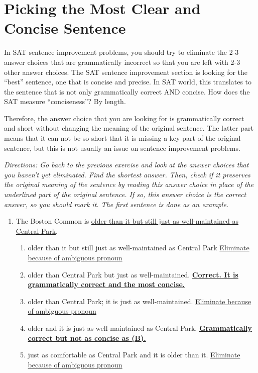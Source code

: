 \section{Picking the Most Clear and Concise Sentence}

In SAT sentence improvement problems, you should try to eliminate the 2-3 answer choices that are grammatically incorrect so that you are left with 2-3 other answer choices. The SAT sentence improvement section is looking for the ``best'' sentence, one that is concise and precise. In SAT world, this translates to the sentence that is not only grammatically correct AND concise. How does the SAT measure ``conciseness''? By length.

\bigskip
Therefore, the answer choice that you are looking for is grammatically correct and short without changing the meaning of the original sentence. The latter part means that it can not be so short that it is missing a key part of the original sentence,
but this is not usually an issue on sentence improvement problems.

\bigskip
\textit{Directions: Go back to the previous exercise and look at the answer choices that you haven't yet eliminated. Find the shortest answer. Then, check if it preserves the original meaning of the sentence by reading this answer choice in place of the underlined part of the original sentence. If so, this answer choice is the correct answer, so you should mark it. The first sentence is done as an example.}

\begin{enumerate}
\item The Boston Common is \ul{ older than it but still just as well-maintained as Central Park}.
\begin{enumerate}[label=(\Alph*)]

\item older than it but still just as well-maintained as Central Park  \ul{Eliminate because of ambiguous pronoun}
\item older than Central Park but just as well-maintained. \textbf{\ul{Correct. It is grammatically correct and the most concise. }}
\item  older than Central Park; it is just as well-maintained.    \ul{Eliminate because of ambiguous pronoun}
\item older and it is just as well-maintained as Central Park. \textbf{\ul{Grammatically correct but not as concise as (B).}}
\item just as comfortable as Central Park and it is older than it. \ul{Eliminate because of ambiguous pronoun}

\end{enumerate}

\end{enumerate} 